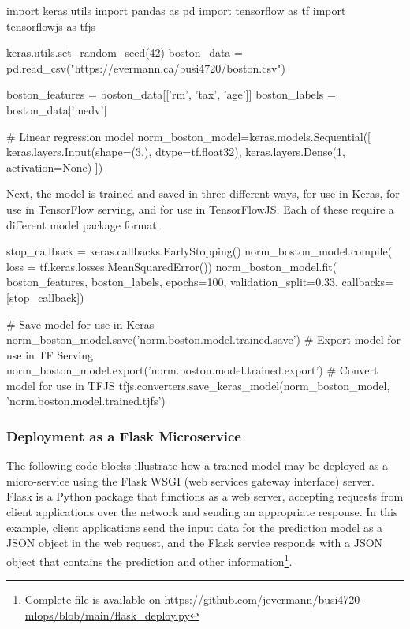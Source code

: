 \begin{samepage}
\begin{pythoncode}
import keras.utils
import pandas as pd
import tensorflow as tf
import tensorflowjs as tfjs

keras.utils.set_random_seed(42)
boston_data = pd.read_csv("https://evermann.ca/busi4720/boston.csv")

boston_features = boston_data[['rm', 'tax', 'age']]
boston_labels = boston_data['medv']

# Linear regression model
norm_boston_model=keras.models.Sequential([
    keras.layers.Input(shape=(3,), dtype=tf.float32),
    keras.layers.Dense(1, activation=None) ])
\end{pythoncode}
\end{samepage}

Next, the model is trained and saved in three different ways, for use in Keras, for use in TensorFlow serving, and for use in TensorFlowJS. Each of these require a different model package format.

\begin{samepage}
\begin{pythoncode}
stop_callback = keras.callbacks.EarlyStopping()
norm_boston_model.compile(
    loss = tf.keras.losses.MeanSquaredError())
norm_boston_model.fit(
    boston_features, boston_labels,
    epochs=100, validation_split=0.33,
    callbacks=[stop_callback])

# Save model for use in Keras
norm_boston_model.save('norm.boston.model.trained.save')
# Export model for use in TF Serving
norm_boston_model.export('norm.boston.model.trained.export')
# Convert model for use in TFJS
tfjs.converters.save_keras_model(norm_boston_model,
    'norm.boston.model.trained.tjfs')
\end{pythoncode}
\end{samepage}

\subsubsection*{Deployment as a Flask Microservice}

The following code blocks illustrate how a trained model may be deployed as a micro-service using the Flask WSGI (web services gateway interface) server. Flask is a Python package that functions as a web server, accepting requests from client applications over the network and sending an appropriate response. In this example, client applications send the input data for the prediction model as a JSON object in the web request, and the Flask service responds with a JSON object that contains the prediction and other information\footnote{Complete file is available on \url{https://github.com/jevermann/busi4720-mlops/blob/main/flask_deploy.py}}.

